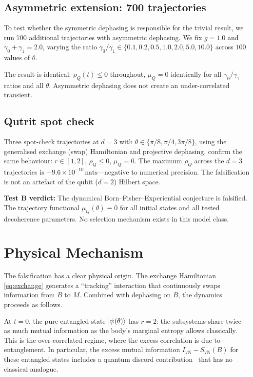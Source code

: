 \documentclass[12pt,a4paper]{article}
\newcommand{\SvN}{S_{\mathrm{vN}}}
\newcommand{\IvN}{I_{\mathrm{vN}}}
\newcommand{\rhoQ}{\rho_Q}
\newcommand{\muQ}{\mu_Q}
\newcommand{\nats}{\,\mathrm{nats}}
\begin{document}
\subsection{Asymmetric extension: 700 trajectories}

To test whether the symmetric dephasing is responsible for the
trivial result, we run $700$ additional trajectories with
asymmetric dephasing.  We fix $g = 1.0$ and $\gamma_0 + \gamma_1
= 2.0$, varying the ratio $\gamma_0/\gamma_1 \in \{0.1, 0.2,
0.5, 1.0, 2.0, 5.0, 10.0\}$ across $100$ values of $\theta$.

The result is identical: $\rhoQ(t) \le 0$ throughout, $\muQ = 0$
identically for all $\gamma_0/\gamma_1$ ratios and all $\theta$.
Asymmetric dephasing does not create an under-correlated transient.

\subsection{Qutrit spot check}

Three spot-check trajectories at $d = 3$ with $\theta \in
\{\pi/8, \pi/4, 3\pi/8\}$, using the generalised exchange
(swap) Hamiltonian and projective dephasing, confirm the same
behaviour: $r \in [1, 2]$, $\rhoQ \le 0$, $\muQ = 0$.  The
maximum $\rhoQ$ across the $d = 3$ trajectories is
$-9.6 \times 10^{-10}\nats$---negative to numerical precision.
The falsification is not an artefact of the qubit ($d = 2$)
Hilbert space.

\medskip
\noindent\textbf{Test B verdict:} The dynamical Born--Fisher--Experiential
conjecture is falsified.  The trajectory functional $\muQ(\theta)
\equiv 0$ for all initial states and all tested decoherence
parameters.  No selection mechanism exists in this model class.

\section{Physical Mechanism}\label{sec:mechanism}

The falsification has a clear physical origin.  The exchange
Hamiltonian \eqref{eq:exchange} generates a ``tracking'' interaction
that continuously swaps information from $B$ to $M$.  Combined with
dephasing on $B$, the dynamics proceeds as follows.

At $t = 0$, the pure entangled state $\ket{\psi(\theta)}$ has $r =
2$: the subsystems share twice as much mutual information as the
body's marginal entropy allows classically.  This is the
over-correlated regime, where the excess correlation is due to
entanglement.  In particular, the excess mutual information
$\IvN - \SvN(B)$ for these entangled states includes a quantum
discord contribution~\cite{OllivierZurek2001} that has no
classical analogue.
\end{document}
